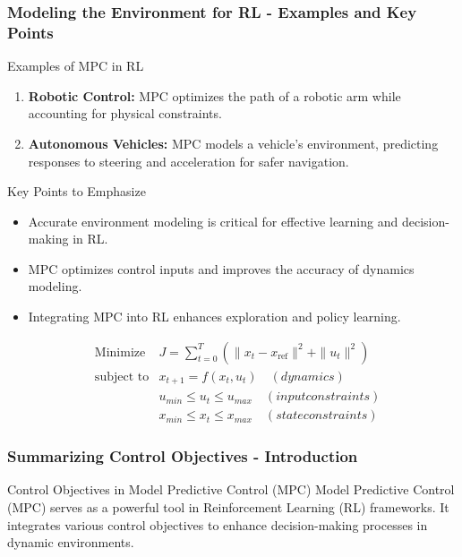 \documentclass[aspectratio=169]{beamer}
\begin{document}
\begin{frame}[fragile]
    \frametitle{Modeling the Environment for RL - Examples and Key Points}
    \begin{block}{Examples of MPC in RL}
        \begin{enumerate}
            \item \textbf{Robotic Control:} MPC optimizes the path of a robotic arm while accounting for physical constraints.
            \item \textbf{Autonomous Vehicles:} MPC models a vehicle's environment, predicting responses to steering and acceleration for safer navigation.
        \end{enumerate}
    \end{block}
    
    \begin{block}{Key Points to Emphasize}
        \begin{itemize}
            \item Accurate environment modeling is critical for effective learning and decision-making in RL.
            \item MPC optimizes control inputs and improves the accuracy of dynamics modeling.
            \item Integrating MPC into RL enhances exploration and policy learning.
        \end{itemize}
    \end{block}

    \begin{equation}
    \begin{aligned}
    & \text{Minimize} & J = \sum_{t=0}^{T} \left( \| x_t - x_{\text{ref}} \|^2 + \| u_t \|^2 \right) \\
    & \text{subject to} & x_{t+1} = f(x_t, u_t) \quad (dynamics) \\
    & & u_{min} \leq u_t \leq u_{max} \quad (input constraints) \\
    & & x_{min} \leq x_t \leq x_{max} \quad (state constraints)
    \end{aligned}
    \end{equation}
\end{frame}

\begin{frame}[fragile]
    \frametitle{Summarizing Control Objectives - Introduction}
    \begin{block}{Control Objectives in Model Predictive Control (MPC)}
        Model Predictive Control (MPC) serves as a powerful tool in Reinforcement Learning (RL) frameworks. It integrates various control objectives to enhance decision-making processes in dynamic environments.
    \end{block}
\end{frame}
\end{document}

